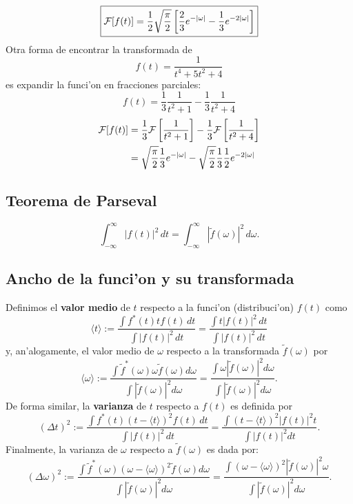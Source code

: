 \begin{equation}
\boxed{ 
{\cal F}[f(t)] =\frac{1}{2}\sqrt{\frac{\pi}{2}}\left[\frac{2}{3} e^{-|\omega|} -\frac{1}{3} e^{-2|\omega|} \right]
 } 
\end{equation} 
Otra forma de encontrar la transformada de
\begin{equation}
f(t) =\frac{1}{t^4 + 5 t^2 + 4}
\end{equation}
es expandir la funci'on en fracciones parciales:
\begin{equation}
f(t) =\frac{1}{3}\frac{1}{t^2 + 1} -\frac{1}{3}\frac{1}{t^2 + 4}
\end{equation}
\begin{align}
{\cal F}[f(t)]
&=\frac{1}{3}{\cal F}\left[\frac{1}{t^2 + 1}\right]
-\frac{1}{3}{\cal F}\left[\frac{1}{t^2+4}\right]\\
&=\sqrt{\frac{\pi}{2}}\frac{1}{3} e^{-|\omega|} -\sqrt{\frac{\pi}{2}}\frac{1}{3}\frac{1}{2} e^{-2|\omega|}
\end{align}        

\subsection{Teorema de Parseval}
\begin{equation}
\boxed{
\int_{-\infty}^\infty |f(t)|^2\,dt=\int_{-\infty}^\infty |\tilde{f}(\omega)|^2\,d\omega.
 }
\end{equation}
    
\subsection{Ancho de la funci'on y su transformada}

Definimos el \textbf{valor medio} de $t$ respecto a la funci'on (distribuci'on) $f(t)$ como
\begin{equation}
\langle t \rangle:=\frac{\int f^{*}(t) t f(t)\,dt}{\int |f(t)|^{2}\, dt}=\frac{\int t |f(t)|^2\,dt}{\int |f(t)|^2\,dt}
\end{equation}
y, an'alogamente, el valor medio de $\omega$ respecto a la transformada $\tilde{f}(\omega)$ por
\begin{equation}
\langle \omega \rangle:=\frac{\int \tilde{f}^{*}(\omega) \omega \tilde{f}(\omega) d\omega}{\int |\tilde{f}(\omega)|^{2} d\omega}=\frac{\int \omega |\tilde{f}(\omega)|^2 d\omega}{\int |\tilde{f}(\omega)|^2 d\omega}.
\end{equation}
De forma similar, la \textbf{varianza} de $t$ respecto a $f(t)$ es definida por
\begin{equation}
(\Delta t)^2:=\frac{\int f^{*}(t)(t-\langle t \rangle)^2 f(t)\,dt}{\int |f(t)|^2\, dt}=\frac{\int (t- \langle t \rangle)^2 |f(t)|^2 t}{\int |f(t)|^2 dt}.
\end{equation}
Finalmente, la varianza de $\omega$ respecto a $\tilde{f}(\omega)$ es dada por:
\begin{equation}
(\Delta \omega)^2:=\frac{\int \tilde{f}^{*}(\omega)(\omega-\langle \omega \rangle)^2 \tilde{f}( \omega) d\omega}{\int |\tilde{f}(\omega)|^2 d\omega}=\frac{\int (\omega- \langle \omega \rangle)^2 |\tilde{f}(\omega)|^2 \omega}{\int |\tilde{f}(\omega)|^2 d\omega}.
\end{equation}


